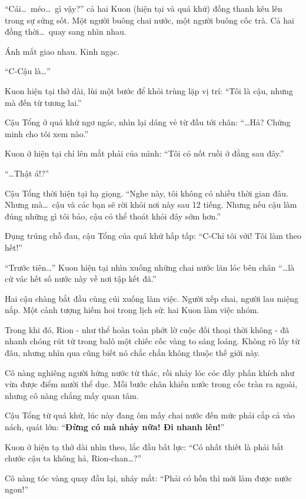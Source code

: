 \documentclass[../main.tex]{subfiles}
\begin{document}
``Cái\dots\ méo\dots\ gì vậy?'' cả hai Kuon (hiện tại và quá khứ) đồng thanh kêu lên trong sự sửng sốt. Một người buông chai nước, một người buông cốc trà. Cả hai đồng thời\dots\ quay sang nhìn nhau.

Ánh mắt giao nhau. Kinh ngạc.

``C-Cậu là\dots''

Kuon hiện tại thở dài, lùi một bước để khỏi trùng lặp vị trí: ``Tôi là cậu, nhưng mà đến từ tương lai.''

Cậu Tổng ở quá khứ ngơ ngác, nhìn lại dáng vẻ từ đầu tới chân: ``\dots Hả? Chứng minh cho tôi xem nào.''

Kuon ở hiện tại chỉ lên mắt phải của mình: ``Tôi có nốt ruồi ở đằng sau đây.''

``\dots Thật á!?''

Cậu Tổng thời hiện tại hạ giọng. ``Nghe này, tôi không có nhiều thời gian đâu. Nhưng mà\dots\ cậu và các bạn sẽ rời khỏi nơi này sau 12 tiếng. Nhưng nếu cậu làm đúng những gì tôi bảo, cậu có thể thoát khỏi đây sớm hơn.''

Đụng trúng chỗ đau, cậu Tổng của quá khứ hấp tấp: ``C-Chỉ tôi với! Tôi làm theo hết!''

``Trước tiên\dots'' Kuon hiện tại nhìn xuống những chai nước lăn lóc bên chân ``\dots là cứ vác hết số nước này về nơi tập kết đã.''

Hai cậu chàng bắt đầu cùng cúi xuống làm việc. Người xếp chai, người lau miệng nắp. Một cảnh tượng hiếm hoi trong lịch sử: hai Kuon làm việc nhóm.

Trong khi đó, Rion - như thể hoàn toàn phớt lờ cuộc đối thoại thời không - đã nhanh chóng rút từ trong balô một chiếc cốc vàng to sáng loáng. Không rõ lấy từ đâu, nhưng nhìn qua cũng biết nó chắc chắn không thuộc thế giới này.

Cô nàng nghiêng người hứng nước từ thác, rồi nhảy lóc cóc đầy phấn khích như vừa được điểm mười thể dục. Mỗi bước chân khiến nước trong cốc tràn ra ngoài, nhưng cô nàng chẳng mấy quan tâm.


Cậu Tổng từ quá khứ, lúc này đang ôm mấy chai nước đến mức phải cắp cả vào nách, quát lớn: ``\textbf{Đừng có mà nhảy nữa! Đi nhanh lên!}''

Kuon ở hiện tạ thở dài nhìn theo, lắc đầu bất lực: ``Có nhất thiết là phải bắt chước cậu ta không hả, Rion-chan\dots?''

Cô nàng tóc vàng quay đầu lại, nháy mắt: ``Phải có hồn thì mới làm được nước ngon!''
\end{document}

